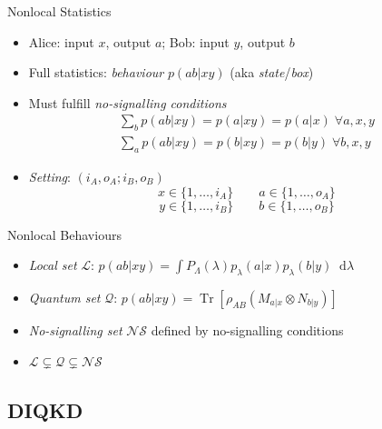 \documentclass[xcolor=dvipsnames]{beamer}
\newcommand{\dif}{\mathop{}\!\mathrm{d}} %
\newcommand{\dintv}[2]{\mathopen\{#1,\ldots,#2\mathclose\}}
\newcommand{\?}{\mathrel{?}} %
\newcommand{\Tr}[2][]{\mathop{\mathrm{Tr}#1}\left[ #2 \right]} %
\newcommand{\Ls}{\mathcal{L}}
\newcommand{\Qs}{\mathcal{Q}}
\newcommand{\NSs}{\mathcal{NS}}
\begin{document}

\begin{frame}{Nonlocal Statistics}
  \begin{itemize}[<+->]
    \item Alice: input \(x\), output \(a\); Bob: input \(y\), output \(b\)
    \item Full statistics: \emph{behaviour} \(p(ab|xy)\) (aka \emph{state}/\emph{box})
    \item Must fulfill \emph{no-signalling conditions}
      \begin{gather*}
        \sum_b p(ab|xy) = p(a|xy) = p(a|x)\;\forall a,x,y \\
        \sum_a p(ab|xy) = p(b|xy) = p(b|y)\;\forall b,x,y
      \end{gather*}
    \item \emph{Setting}: \((i_A, o_A; i_B, o_B)\)
      \[ x \in \dintv{1}{i_A} \qquad a \in \dintv{1}{o_A} \]
      \[ y \in \dintv{1}{i_B} \qquad b \in \dintv{1}{o_B} \]
  \end{itemize}
\end{frame}

\begin{frame}{Nonlocal Behaviours}
  \begin{itemize}[<+->]
    \item \emph{Local set} \(\Ls\): \(p(ab|xy) = \int P_{\Lambda}(\lambda) p_{\lambda}(a|x)p_{\lambda}(b|y) \dif{\lambda} \)
    \item \emph{Quantum set} \(\Qs\): \(p(ab|xy) = \Tr{ \rho_{AB} \left(M_{a|x} \otimes N_{b|y}\right) }\)
    \item \emph{No-signalling set} \(\NSs\) defined by no-signalling conditions
    \item \(\Ls \subsetneq \Qs \subsetneq \NSs\)
  \end{itemize}
\end{frame}

\subsection{DIQKD}
\end{document}
